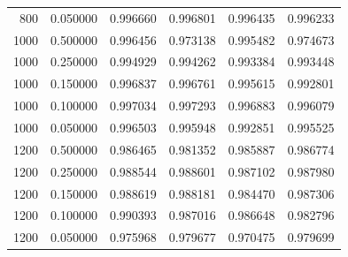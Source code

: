 \begin{tabular}{rrrrrr}
800 & 0.050000 & 0.996660 & 0.996801 & 0.996435 & 0.996233 \\
1000 & 0.500000 & 0.996456 & 0.973138 & 0.995482 & 0.974673 \\
1000 & 0.250000 & 0.994929 & 0.994262 & 0.993384 & 0.993448 \\
1000 & 0.150000 & 0.996837 & 0.996761 & 0.995615 & 0.992801 \\
1000 & 0.100000 & 0.997034 & 0.997293 & 0.996883 & 0.996079 \\
1000 & 0.050000 & 0.996503 & 0.995948 & 0.992851 & 0.995525 \\
1200 & 0.500000 & 0.986465 & 0.981352 & 0.985887 & 0.986774 \\
1200 & 0.250000 & 0.988544 & 0.988601 & 0.987102 & 0.987980 \\
1200 & 0.150000 & 0.988619 & 0.988181 & 0.984470 & 0.987306 \\
1200 & 0.100000 & 0.990393 & 0.987016 & 0.986648 & 0.982796 \\
1200 & 0.050000 & 0.975968 & 0.979677 & 0.970475 & 0.979699 \\
\bottomrule
\end{tabular}
